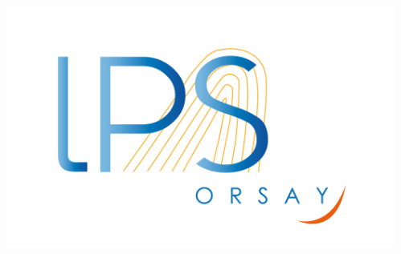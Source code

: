 \begin{frame}
\begin{columns}
\begin{column}{6cm}
\end{column}
\begin{column}{2cm}
~\\
~\\
~\\
~\\
\raggedleft
\includegraphics[scale=.15]{img/0_cover/logo-lps.jpg}
\end{column}
\end{columns}
\end{frame}
